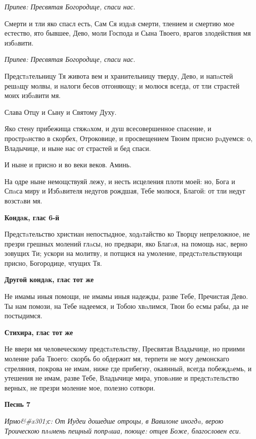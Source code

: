 \itshape Припев:\normalfont{} Пресвятая Богородице, спаси нас.


Смерти и тли яко спасл есть, Сам Ся издaв смерти, тлением и смертию мое естество, ято бывшее, Дево, моли Господа и Сына Твоего, врагов злодействия мя избaвити.


\itshape Припев:\normalfont{} Пресвятая Богородице, спаси нас.


Предстaтельницу Тя живота вем и хранительницу тверду, Дево, и напaстей решaщу молвы, и налоги бесов отгоняющу; и молюся всегда, от тли страстей моих избaвити мя.


Слава Отцу и Сыну и Святому Духу.


Яко стену прибежища стяжaхом, и душ всесовершенное спасение, и прострaнство в скорбех, Отроковице, и просвещением Твоим присно рaдуемся: о, Владычице, и ныне нас от страстей и бед спаси.


И ныне и присно и во веки веков. Аминь.


На одре ныне немощствуяй лежу, и несть исцеления плоти моей: но, Бога и Спaса миру и Избaвителя недугов рождшая, Тебе молюся, Благой: от тли недуг возстaви мя.




\bfseries Кондaк, глас 6-й\normalfont{}


Предстaтельство христиан непостыдное, ходaтайство ко Творцу непреложное, не презри грешных молений глaсы, но предвари, яко Благaя, на помощь нас, верно зовущих Ти; ускори на молитву, и потщися на умоление, предстaтельствующи присно, Богородице, чтущих Тя.




\bfseries Другой кондaк, глас тот же\normalfont{}


 Не имамы иныя помощи, не имамы иныя надежды, разве Тебе, Пречистая Дево. Ты нам помози, на Тебе надеемся, и Тобою хвaлимся, Твои бо есмы рабы, да не постыдимся.




\bfseries Стихира, глас тот же\normalfont{}


Не ввери мя человеческому предстaтельству, Пресвятая Владычице, но приими моление раба Твоего: скорбь бо обдержит мя, терпети не могу демонскаго стреляния, покрова не имам, ниже где прибегну, окаянный, всегда побеждaемь, и утешения не имам, разве Тебе, Владычице мира, уповaние и предстaтельство верных, не презри моление мое, полезно сотвори.




\bfseries Песнь 7\normalfont{}


\itshape Ирмо&#x301;с:\normalfont{} От Иудеи дошедше отроцы, в Вавилоне иногдa, верою Троическою плaмень пещный попрaша, поюще: отцев Боже, благословен еси.


